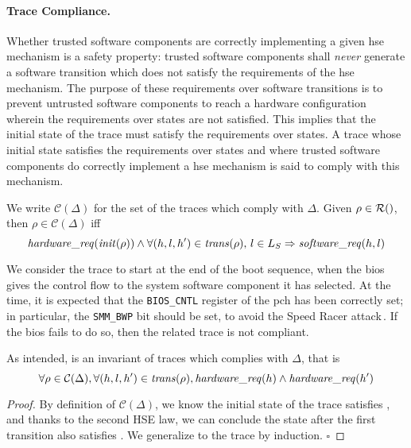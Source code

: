 \paragraph{Trace Compliance.}
%
Whether trusted software components are correctly implementing a given \ac{hse}
mechanism is a safety property: trusted software components shall \emph{never}
generate a software transition which does not satisfy the requirements of the
\ac{hse} mechanism.
%
The purpose of these requirements over software transitions is to
prevent untrusted software components to reach a hardware configuration wherein
the requirements over states are not satisfied. This implies that the initial state of the
trace must satisfy the requirements over states.
%
A trace whose initial state satisfies the requirements over states and where
trusted software components do correctly implement a \ac{hse} mechanism is said
to comply with this mechanism.

\begin{definition}
  We write $\mathcal{C}(\Delta)$ for the set of the traces which comply with
  $\Delta$.
  Given $\rho \in \pathesLTS{Ez}$, then $\rho \in \mathcal{C}(\Delta)$ iff
  \[
    \mathit{hardware\_req}(\mathit{init}(\rho)) \wedge \forall (h,l,h') \in
    \mathit{trans}(\rho)\text{, }l \in L_S \Rightarrow \mathit{software\_req}(h, l)
  \]
\end{definition}

\begin{example}
  We consider the trace to start at the end of the boot sequence, when the
  \ac{bios} gives the control flow to the system software component it has
  selected.
  At the time, it is expected that the \texttt{BIOS\_CNTL} register of the
  \ac{pch} has been correctly set; in particular, the \texttt{SMM\_BWP} bit
  should be set, to avoid the Speed Racer
  attack\,\cite{kallenberg2015racecondition}.
  If the \ac{bios} fails to do so, then the related trace is not compliant.
\end{example}

\begin{lemma}
  \label{lemma:speccert:hseinv}
  As intended,  is an invariant of traces which complies
  with $\Delta$, that is
  \[
    \forall \rho \in \mathcal{C}(\Delta), \forall (h, l, h') \in
    \mathit{trans}(\rho), \mathit{hardware\_req}(h) \wedge \mathit{hardware\_req}(h')
  \]

  \begin{proof}
    By definition of $\mathcal{C}(\Delta)$, we know the initial state of the
    trace satisfies , and thanks to the second HSE law, we
    can conclude the state after the first transition also satisfies
    .
    We generalize to the trace by induction.
    \hfill \( \square \)
  \end{proof}
\end{lemma}


